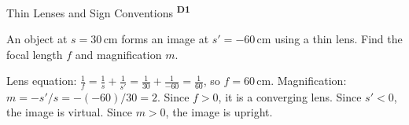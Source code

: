 ﻿\documentclass[12pt,a4paper]{article}
\providecommand{\KPProblems}{}
\newcommand{\DOne}{\texorpdfstring{\textsuperscript{\textbf{D1}}}{ D1}}
\begin{document}
\begin{KnowledgePoint}{Thin Lenses and Sign Conventions \DOne}
  \KPProblems
  \begin{center}
  \end{center}
\begin{cheatproblem}
  An object at $s=30\,\text{cm}$ forms an image at $s'=-60\,\text{cm}$ using a thin lens. Find the focal length $f$ and magnification $m$.
  \begin{solutionbox}
  Lens equation: $\tfrac{1}{f}=\tfrac{1}{s}+\tfrac{1}{s'}=\tfrac{1}{30}+\tfrac{1}{-60}=\tfrac{1}{60}$, so $f=60\,\text{cm}$.
  Magnification: $m=-s'/s = -(-60)/30=2$.
  Since $f>0$, it is a converging lens. Since $s'<0$, the image is virtual. Since $m>0$, the image is upright.
  \end{solutionbox}
  \end{cheatproblem}
\end{KnowledgePoint}
\end{document}
